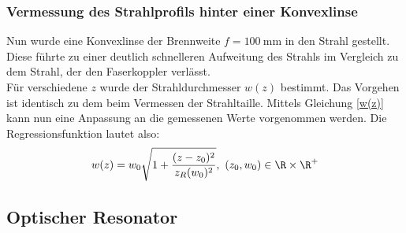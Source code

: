 \documentclass[11pt,a4paper,oneside]{scrartcl}
\begin{document}
\subsubsection{Vermessung des Strahlprofils hinter einer Konvexlinse}
Nun wurde eine Konvexlinse der Brennweite $f=100\ \mathrm{mm}$ in den Strahl gestellt. Diese führte zu einer deutlich schnelleren Aufweitung des Strahls im Vergleich zu dem Strahl, der den Faserkoppler verlässt. \\
Für verschiedene $z$ wurde der Strahldurchmesser $w(z)$ bestimmt. Das Vorgehen ist identisch zu dem beim Vermessen der Strahltaille. Mittels Gleichung \ref{w(z)} kann nun eine Anpassung an die gemessenen Werte vorgenommen werden. Die Regressionsfunktion lautet also:
\begin{equation}\label{w(z)}
w(z)=w_0\sqrt{1+\frac{(z-z_0)^2}{z_R(w_0)^2}},\ (z_0,w_0)\in \R\times\R^+
\end{equation}
\subsection{Optischer Resonator}
\end{document}
